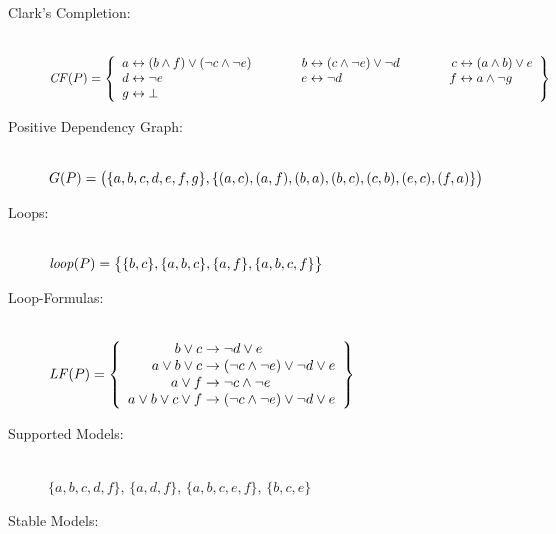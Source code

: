 \begin{Loesung}
\begin{UList}
\begin{description}
%
\item[Clark's Completion:] ~\\
\hspace*{-15mm}
\(
\Comp{\Pi} =
\left\{
\begin{array}{r@{}c@{}l@{\hspace{13.8mm}}r@{}c@{}l@{\hspace{13.8mm}}r@{}c@{}l}
a & {} \leftrightarrow {} & (b\wedge f)\vee (\neg c\wedge\neg e) &
b & {} \leftrightarrow {} & (c\wedge \neg e)\vee \neg d & 
c & {} \leftrightarrow {} & (a\wedge b)\vee e
\\
d & {} \leftrightarrow {} & \neg e &
e & {} \leftrightarrow {} & \neg d &
f & {} \leftrightarrow {} & a\wedge\neg g
\\
g & {} \leftrightarrow {} & \bot 
\end{array}
\right\}
\)
%
\item[Positive Dependency Graph:] ~\\
$G(P)=\big(\{a,b,c,d,e,f,g\},\{(a,c),(a,f),(b,a),(b,c),(c,b),(e,c),(f,a)\}\big)$
%
\item[Loops:] ~\\
$\mathit{loop}(P)=\big\{\{b,c\},\{a,b,c\},\{a,f\},\{a,b,c,f\}\big\}$
%
\item[Loop-Formulas:] ~\\
$\LF{\Pi}=
\left\{
  \begin{array}{r@{{}\rightarrow{}}l}
    b \vee c & \neg d \vee e
  \\
    a \vee b \vee c & (\neg c\wedge\neg e) \vee \neg d \vee e
  \\
    a \vee f & \neg c\wedge\neg e
  \\
    a \vee b \vee c \vee f & (\neg c\wedge\neg e) \vee \neg d \vee e
  \end{array}
\right\}$
%
\item[Supported Models:] ~\\
$\{a,b,c,d,f\}$, $\{a,d,f\}$, $\{a,b,c,e,f\}$, $\{b,c,e\}$
%
\item[Stable Models:] ~\\

\end{description}
\end{UList}
\end{Loesung}
